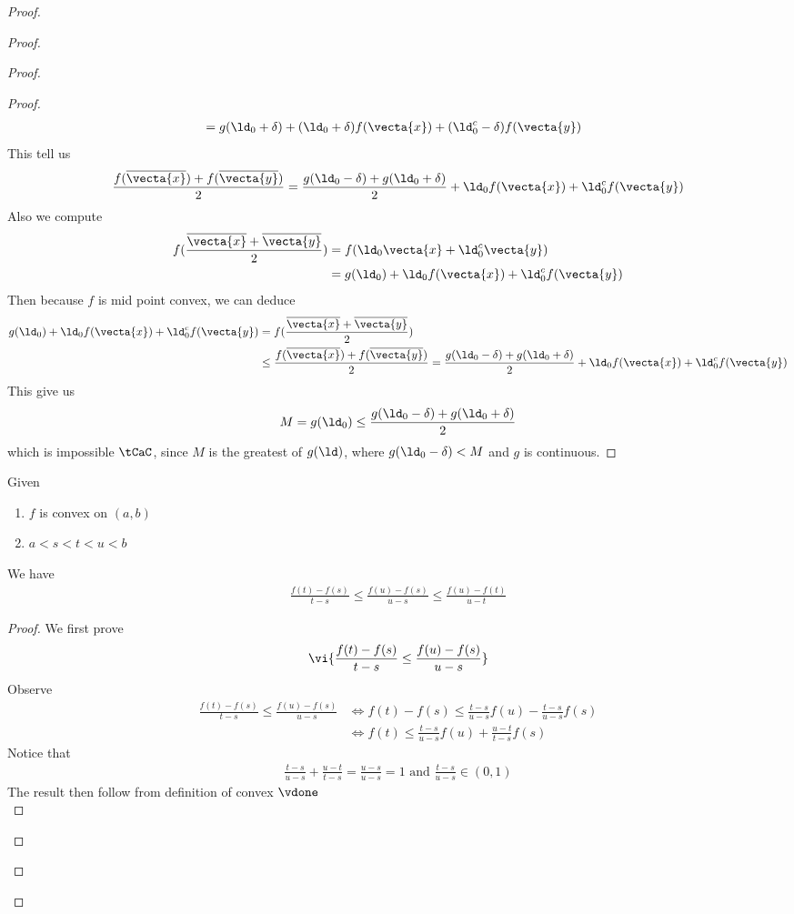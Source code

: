 \documentclass{report}
\begin{document}
\begin{proof}
\begin{proof}
\begin{proof}
\begin{proof}
\begin{align*}
&=g(\ld _0+\delta)+(\ld _0+\delta)f(\vecta{x})+(\ld _0^c-\delta)f(\vecta{y})
\end{align*}
This tell us 
\begin{align*}
\frac{f(\overline{\vecta{x}})+f(\overline{\vecta{y}})}{2}=\frac{g(\ld _0-\delta)+g(\ld _0+\delta)}{2}+ \ld_0 f(\vecta{x})+\ld _0^c f(\vecta{y})
\end{align*}
Also we compute 
\begin{align*}
f(\frac{\overline{\vecta{x}}+\overline{\vecta{y}}}{2})&=f(\ld _0\vecta{x}+\ld _0^c \vecta{y})\\
&=g(\ld _0)+ \ld _0 f(\vecta{x})+\ld _0^c f(\vecta{y})
\end{align*}
Then because $f$ is mid point convex, we can deduce 
\begin{align*}
g(\ld _0)+\ld _0 f(\vecta{x})+\ld _0^c f(\vecta{y})&=f(\frac{\overline{\vecta{x}}+\overline{\vecta{y}}}{2})\\
&\leq \frac{f(\overline{\vecta{x}})+f(\overline{\vecta{y}})}{2}=\frac{g(\ld _0-\delta)+g(\ld _0+\delta)}{2}+ \ld _0 f(\vecta{x})+\ld _0^c f(\vecta{y})
\end{align*}
This give us 
\begin{align*}
M=g(\ld _0)\leq \frac{g(\ld _0-\delta)+g(\ld _0+\delta)}{2}
\end{align*}
which is impossible $\tCaC$, since $M$ is the greatest of  $g(\ld )$, where $g(\ld _0-\delta)<M$ and $g$ is continuous.
\end{proof}
\begin{lemma}
\label{5.2.8}
Given 
\begin{enumerate}[label=(\alph*)]
  \item $f$ is convex on $(a,b)$ 
  \item $a<s<t<u<b$
\end{enumerate}
We have 
\begin{align*}
\frac{f(t)-f(s)}{t-s}\leq \frac{f(u)-f(s)}{u-s}\leq \frac{f(u)-f(t)}{u-t}
\end{align*}
\end{lemma}
\begin{proof}
We first prove 
\begin{align*}
\vi{\frac{f(t)-f(s)}{t-s}\leq \frac{f(u)-f(s)}{u-s}}
\end{align*}
Observe 
\begin{align*}
  \frac{f(t)-f(s)}{t-s}\leq \frac{f(u)-f(s)}{u-s}&\iff  f(t)-f(s)\leq \frac{t-s}{u-s}f(u)-\frac{t-s}{u-s}f(s)\\
&\iff f(t)\leq \frac{t-s}{u-s}f(u)+\frac{u-t}{t-s}f(s)
\end{align*}
Notice that 
\begin{align*}
\frac{t-s}{u-s}+\frac{u-t}{t-s}=\frac{u-s}{u-s}=1\text{ and }\frac{t-s}{u-s}\in (0,1)
\end{align*}
The result then follow from definition of convex  $\vdone$\\


\end{proof}
\end{proof}
\end{proof}
\end{proof}
\end{document}
